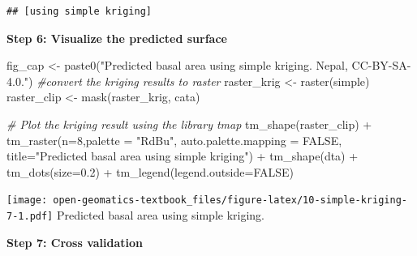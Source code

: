 \documentclass[
]{book}
\newenvironment{Shaded}{\begin{snugshade}}{\end{snugshade}}
\newcommand{\AttributeTok}[1]{\textcolor[rgb]{0.77,0.63,0.00}{#1}}
\newcommand{\CommentTok}[1]{\textcolor[rgb]{0.56,0.35,0.01}{\textit{#1}}}
\newcommand{\ConstantTok}[1]{\textcolor[rgb]{0.00,0.00,0.00}{#1}}
\newcommand{\DecValTok}[1]{\textcolor[rgb]{0.00,0.00,0.81}{#1}}
\newcommand{\DocumentationTok}[1]{\textcolor[rgb]{0.56,0.35,0.01}{\textbf{\textit{#1}}}}
\newcommand{\FloatTok}[1]{\textcolor[rgb]{0.00,0.00,0.81}{#1}}
\newcommand{\FunctionTok}[1]{\textcolor[rgb]{0.00,0.00,0.00}{#1}}
\newcommand{\NormalTok}[1]{#1}
\newcommand{\OtherTok}[1]{\textcolor[rgb]{0.56,0.35,0.01}{#1}}
\newcommand{\SpecialCharTok}[1]{\textcolor[rgb]{0.00,0.00,0.00}{#1}}
\newcommand{\StringTok}[1]{\textcolor[rgb]{0.31,0.60,0.02}{#1}}
\begin{document}
\begin{verbatim}
## [using simple kriging]
\end{verbatim}

\textbf{Step 6: Visualize the predicted surface}

\begin{Shaded}
\begin{Highlighting}[]
\NormalTok{fig\_cap }\OtherTok{\textless{}{-}} \FunctionTok{paste0}\NormalTok{(}\StringTok{"Predicted basal area using simple kriging. Nepal, CC{-}BY{-}SA{-}4.0."}\NormalTok{)}
\CommentTok{\#convert the kriging results to raster}
\NormalTok{raster\_krig      }\OtherTok{\textless{}{-}} \FunctionTok{raster}\NormalTok{(simple)}
\NormalTok{raster\_clip    }\OtherTok{\textless{}{-}} \FunctionTok{mask}\NormalTok{(raster\_krig, cata)}

\CommentTok{\# Plot the kriging result using the library tmap}
\FunctionTok{tm\_shape}\NormalTok{(raster\_clip) }\SpecialCharTok{+} 
  \FunctionTok{tm\_raster}\NormalTok{(}\AttributeTok{n=}\DecValTok{8}\NormalTok{,}\AttributeTok{palette =} \StringTok{"RdBu"}\NormalTok{, }\AttributeTok{auto.palette.mapping =} \ConstantTok{FALSE}\NormalTok{,}
            \AttributeTok{title=}\StringTok{"Predicted basal area using simple kriging"}\NormalTok{) }\SpecialCharTok{+} 
  \FunctionTok{tm\_shape}\NormalTok{(dta) }\SpecialCharTok{+} \FunctionTok{tm\_dots}\NormalTok{(}\AttributeTok{size=}\FloatTok{0.2}\NormalTok{) }\SpecialCharTok{+}
  \FunctionTok{tm\_legend}\NormalTok{(}\AttributeTok{legend.outside=}\ConstantTok{FALSE}\NormalTok{)}
\end{Highlighting}
\end{Shaded}

\texttt{[image: open-geomatics-textbook\_files/figure-latex/10-simple-kriging-7-1.pdf]}
Predicted basal area using simple kriging.

\textbf{Step 7: Cross validation}

\begin{Shaded}
\end{Shaded}
\end{document}
